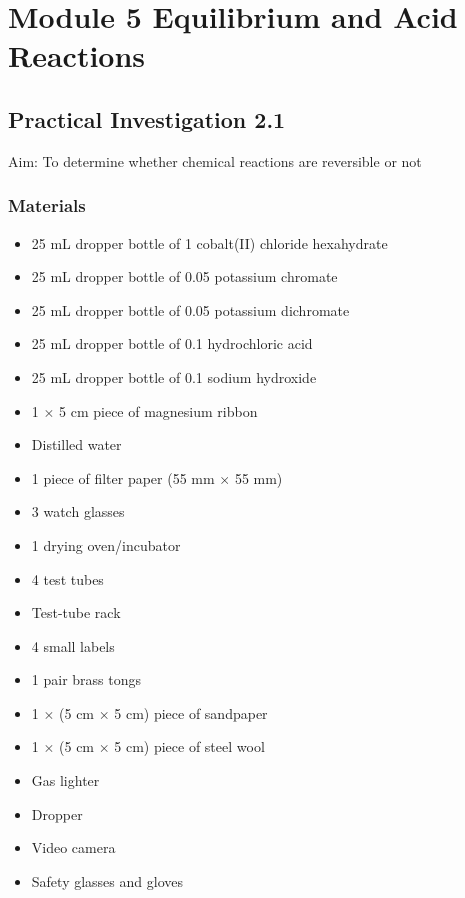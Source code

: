 
\chapter{Module 5 \hspace{0.5em} Equilibrium and Acid Reactions}

\section{Practical Investigation 2.1} \label{23/10/2024}
	Aim: To determine whether chemical reactions are reversible or not

	\subsection{Materials}
		\begin{itemize}
			\item 25 mL dropper bottle of \qty{1}{\moLar} cobalt(II) chloride hexahydrate
			\item 25 mL dropper bottle of \qty{0.05}{\moLar} potassium chromate
			\item 25 mL dropper bottle of \qty{0.05}{\moLar} potassium dichromate
			\item 25 mL dropper bottle of \qty{0.1}{\moLar} hydrochloric acid
			\item 25 mL dropper bottle of \qty{0.1}{\moLar} sodium hydroxide
			\item 1 $\times$ 5 cm piece of magnesium ribbon
			\item Distilled water
			\item 1 piece of filter paper (55 mm $\times$ 55 mm)
			\item 3 watch glasses
			\item 1 drying oven/incubator
			\item 4 test tubes
			\item Test-tube rack
			\item 4 small labels
			\item 1 pair brass tongs
			\item 1 $\times$ (5 cm $\times$ 5 cm) piece of sandpaper
			\item 1 $\times$ (5 cm $\times$ 5 cm) piece of steel wool
			\item Gas lighter
			\item Dropper
			\item Video camera
			\item Safety glasses and gloves
		\end{itemize}

